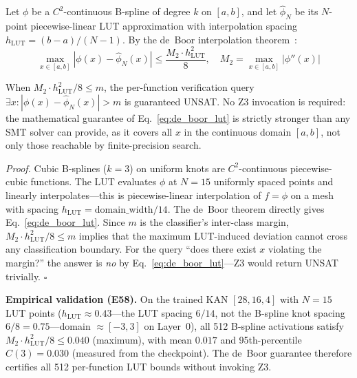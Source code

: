 \vspace{4pt}
\setcounter{theorem}{6}
\begin{theorem}
\label{thm:z3-verifiability}
Let $\phi$ be a $C^2$-continuous B-spline of degree $k$ on $[a,b]$, and
let $\hat{\phi}_N$ be its $N$-point piecewise-linear LUT approximation
with interpolation spacing $h_{\text{LUT}} = (b-a)/(N-1)$. By the de~Boor
interpolation theorem~\cite{deBoor1978}:
\begin{equation}
\max_{x \in [a,b]} |\phi(x) - \hat{\phi}_N(x)| \leq
\frac{M_2 \cdot h_{\text{LUT}}^2}{8},
\quad M_2 = \max_{x \in [a,b]} |\phi''(x)|
\label{eq:de_boor_lut}
\end{equation}

When $M_2 \cdot h_{\text{LUT}}^2 / 8 \leq m$, the per-function verification
query $\exists x: |\phi(x) - \hat{\phi}_N(x)| > m$ is guaranteed UNSAT.
No Z3 invocation is required: the mathematical guarantee of
Eq.~\ref{eq:de_boor_lut} is strictly stronger than any SMT solver can
provide, as it covers all $x$ in the continuous domain $[a,b]$, not only
those reachable by finite-precision search.
\end{theorem}

\vspace{4pt}
\noindent\textit{Proof.}
Cubic B-splines ($k=3$) on uniform knots are $C^2$-continuous
piecewise-cubic functions. The LUT evaluates $\phi$ at $N=15$ uniformly
spaced points and linearly interpolates---this is piecewise-linear
interpolation of $f=\phi$ on a mesh with spacing $h_{\text{LUT}} =
\text{domain\_width} / 14$. The de~Boor theorem directly gives
Eq.~\ref{eq:de_boor_lut}. Since $m$ is the classifier's inter-class
margin, $M_2 \cdot h_{\text{LUT}}^2 / 8 \leq m$ implies that the
maximum LUT-induced deviation cannot cross any classification boundary.
For the query ``does there exist $x$ violating the margin?'' the answer
is \textit{no} by Eq.~\ref{eq:de_boor_lut}---Z3 would return UNSAT
trivially. $\square$

\vspace{4pt}
\noindent\textbf{Empirical validation (E58).}
On the trained KAN $[28,16,4]$ with $N=15$ LUT points ($h_{\text{LUT}}
\approx 0.43$---the LUT spacing $6/14$, not the B-spline knot spacing
$6/8 = 0.75$---domain $\approx [-3, 3]$ on Layer~0), all 512 B-spline
activations satisfy $M_2 \cdot h_{\text{LUT}}^2 / 8 \leq 0.040$ (maximum),
with mean $0.017$ and 95th-percentile $C(3) = 0.030$ (measured from the
checkpoint). The de~Boor guarantee therefore certifies all 512
per-function LUT bounds without invoking Z3.

